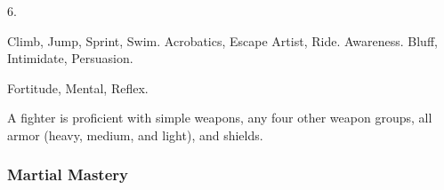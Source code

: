          6.

         Climb, Jump, Sprint, Swim.
         Acrobatics, Escape Artist, Ride.
         Awareness.
         Bluff, Intimidate, Persuasion.

          Fortitude,  Mental,  Reflex.

        A fighter is proficient with simple weapons, any four other weapon groups,  all armor (heavy, medium, and light), and shields.


        \subsubsection{Martial Mastery}

